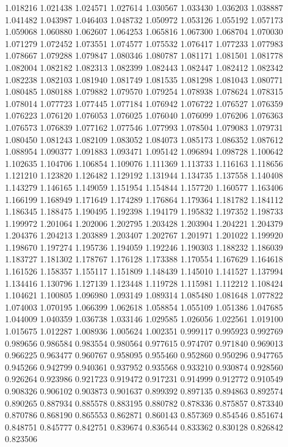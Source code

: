 1.018216
1.021438
1.024571
1.027614
1.030567
1.033430
1.036203
1.038887
1.041482
1.043987
1.046403
1.048732
1.050972
1.053126
1.055192
1.057173
1.059068
1.060880
1.062607
1.064253
1.065816
1.067300
1.068704
1.070030
1.071279
1.072452
1.073551
1.074577
1.075532
1.076417
1.077233
1.077983
1.078667
1.079288
1.079847
1.080346
1.080787
1.081171
1.081501
1.081778
1.082004
1.082182
1.082313
1.082399
1.082443
1.082447
1.082412
1.082342
1.082238
1.082103
1.081940
1.081749
1.081535
1.081298
1.081043
1.080771
1.080485
1.080188
1.079882
1.079570
1.079254
1.078938
1.078624
1.078315
1.078014
1.077723
1.077445
1.077184
1.076942
1.076722
1.076527
1.076359
1.076223
1.076120
1.076053
1.076025
1.076040
1.076099
1.076206
1.076363
1.076573
1.076839
1.077162
1.077546
1.077993
1.078504
1.079083
1.079731
1.080450
1.081243
1.082109
1.083052
1.084073
1.085173
1.086352
1.087612
1.088954
1.090377
1.091883
1.093471
1.095142
1.096894
1.098728
1.100642
1.102635
1.104706
1.106854
1.109076
1.111369
1.113733
1.116163
1.118656
1.121210
1.123820
1.126482
1.129192
1.131944
1.134735
1.137558
1.140408
1.143279
1.146165
1.149059
1.151954
1.154844
1.157720
1.160577
1.163406
1.166199
1.168949
1.171649
1.174289
1.176864
1.179364
1.181782
1.184112
1.186345
1.188475
1.190495
1.192398
1.194179
1.195832
1.197352
1.198733
1.199972
1.201064
1.202006
1.202795
1.203428
1.203904
1.204221
1.204379
1.204376
1.204213
1.203889
1.203407
1.202767
1.201971
1.201022
1.199920
1.198670
1.197274
1.195736
1.194059
1.192246
1.190303
1.188232
1.186039
1.183727
1.181302
1.178767
1.176128
1.173388
1.170554
1.167629
1.164618
1.161526
1.158357
1.155117
1.151809
1.148439
1.145010
1.141527
1.137994
1.134416
1.130796
1.127139
1.123448
1.119728
1.115981
1.112212
1.108424
1.104621
1.100805
1.096980
1.093149
1.089314
1.085480
1.081648
1.077822
1.074003
1.070195
1.066399
1.062618
1.058854
1.055109
1.051386
1.047685
1.044009
1.040359
1.036738
1.033146
1.029585
1.026056
1.022561
1.019100
1.015675
1.012287
1.008936
1.005624
1.002351
0.999117
0.995923
0.992769
0.989656
0.986584
0.983554
0.980564
0.977615
0.974707
0.971840
0.969013
0.966225
0.963477
0.960767
0.958095
0.955460
0.952860
0.950296
0.947765
0.945266
0.942799
0.940361
0.937952
0.935568
0.933210
0.930874
0.928560
0.926264
0.923986
0.921723
0.919472
0.917231
0.914999
0.912772
0.910549
0.908326
0.906102
0.903873
0.901637
0.899392
0.897135
0.894863
0.892574
0.890265
0.887934
0.885578
0.883195
0.880782
0.878336
0.875857
0.873340
0.870786
0.868190
0.865553
0.862871
0.860143
0.857369
0.854546
0.851674
0.848751
0.845777
0.842751
0.839674
0.836544
0.833362
0.830128
0.826842
0.823506
